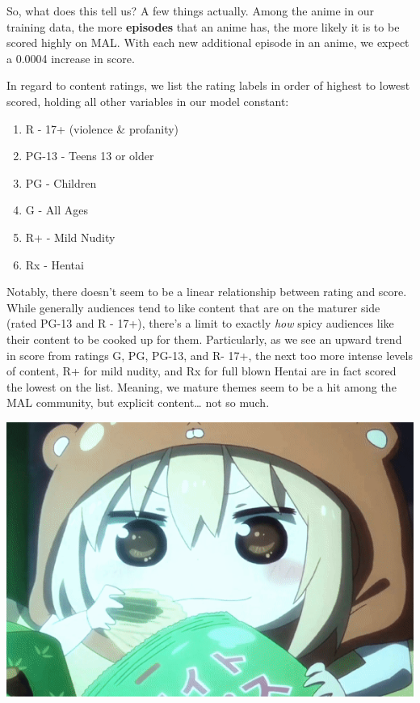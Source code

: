 \documentclass[
]{article}
\begin{document}
So, what does this tell us? A few things actually. Among the anime in
our training data, the more \textbf{episodes} that an anime has, the
more likely it is to be scored highly on MAL. With each new additional
episode in an anime, we expect a 0.0004 increase in score.

In regard to content ratings, we list the rating labels in order of
highest to lowest scored, holding all other variables in our model
constant:

\begin{enumerate}
\def\labelenumi{\arabic{enumi})}
\item
  R - 17+ (violence \& profanity)
\item
  PG-13 - Teens 13 or older
\item
  PG - Children
\item
  G - All Ages
\item
  R+ - Mild Nudity
\item
  Rx - Hentai
\end{enumerate}

Notably, there doesn't seem to be a linear relationship between rating
and score. While generally audiences tend to like content that are on
the maturer side (rated PG-13 and R - 17+), there's a limit to exactly
\emph{how} spicy audiences like their content to be cooked up for them.
Particularly, as we see an upward trend in score from ratings G, PG,
PG-13, and R- 17+, the next too more intense levels of content, R+ for
mild nudity, and Rx for full blown Hentai are in fact scored the lowest
on the list. Meaning, we mature themes seem to be a hit among the MAL
community, but explicit content\ldots{} not so much.

\includegraphics{./img/watch_tv.gif}
\end{document}
